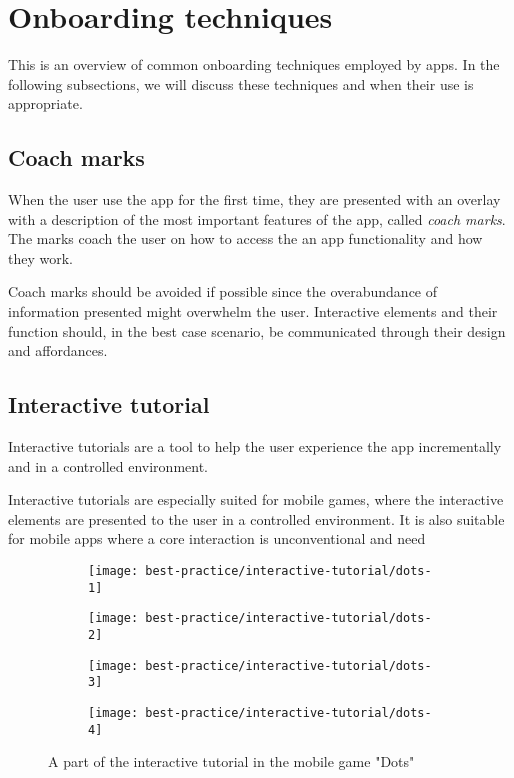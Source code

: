 \section{Onboarding techniques}

This is an overview of common onboarding techniques employed by apps. In the following subsections, we will discuss these techniques and when their use is appropriate.

\subsection{Coach marks}
When the user use the app for the first time, they are presented with an overlay with a description of the most important features of the app, called \textit{coach marks}. The marks coach the user on how to access the an app functionality and how they work.

Coach marks should be avoided if possible since the overabundance of information presented might overwhelm the user. Interactive elements and their function should, in the best case scenario, be communicated through their design and affordances.

\subsection{Interactive tutorial}

Interactive tutorials are a tool to help the user experience the app incrementally and in a controlled environment.

Interactive tutorials are especially suited for mobile games, where the interactive elements are presented to the user in a controlled environment. It is also suitable for mobile apps where a core interaction is unconventional and need

\begin{figure}[ht]
\begin{subfigure}{.25\textwidth}
  \centering
  \texttt{[image: best-practice/interactive-tutorial/dots-1]}
  \label{subfig:best-practice/interactive-tutorial/dots-1}
\end{subfigure}%
\begin{subfigure}{.25\textwidth}
  \centering
  \texttt{[image: best-practice/interactive-tutorial/dots-2]}
  \label{subfig:best-practice/interactive-tutorial/dots-2}
\end{subfigure}%
\begin{subfigure}{.25\textwidth}
  \centering
  \texttt{[image: best-practice/interactive-tutorial/dots-3]}
  \label{subfig:best-practice/interactive-tutorial/dots-3}
\end{subfigure}%
\begin{subfigure}{.25\textwidth}
  \centering
  \texttt{[image: best-practice/interactive-tutorial/dots-4]}
  \label{subfig:best-practice/interactive-tutorial/dots-4}
\end{subfigure}%
\caption{A part of the interactive tutorial in the mobile game "Dots"}
\label{fig:general-overview}
\end{figure}

